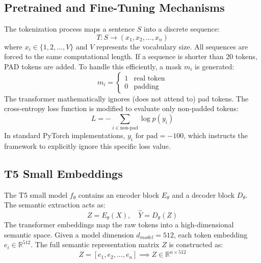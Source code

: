 \documentclass[twocolumn]{article}
\begin{document}
\subsection{\textbf{Pretrained and Fine-Tuning Mechanisms}}
The tokenization process maps a sentence $S$ into a discrete sequence:
\begin{equation}
    T: S \rightarrow (x_1, x_2, \dots, x_n)
\end{equation}
where $x_i \in \{1, 2, \dots, V\}$ and $V$ represents the vocabulary size. All sequences are forced to the same computational length. If a sequence is shorter than 20 tokens, PAD tokens are added. To handle this efficiently, a mask $m_i$ is generated:
\begin{equation}
    m_i = 
    \begin{cases} 
        1 & \text{real token} \\ 
        0 & \text{padding} 
    \end{cases}
\end{equation}
The transformer mathematically ignores (does not attend to) pad tokens. The cross-entropy loss function is modified to evaluate only non-padded tokens:
\begin{equation}
    L = - \sum_{i \in \text{non-pad}} \log p(y_i)
\end{equation}
In standard PyTorch implementations, $y_i \text{ for pad} = -100$, which instructs the framework to explicitly ignore this specific loss value.

\subsection{\textbf{T5 Small Embeddings}}
The T5 small model $f_\theta$ contains an encoder block $E_\theta$ and a decoder block $D_\theta$. The semantic extraction acts as:
\begin{equation}
    Z = E_\theta(X), \quad \hat{Y} = D_\theta(Z)
\end{equation}
The transformer embeddings map the raw tokens into a high-dimensional semantic space. Given a model dimension $d_{model} = 512$, each token embedding $e_i \in \mathbb{R}^{512}$. The full semantic representation matrix $Z$ is constructed as:
\begin{equation}
    Z = [e_1, e_2, \dots, e_n] \implies Z \in \mathbb{R}^{n \times 512}
\end{equation}
\end{document}
